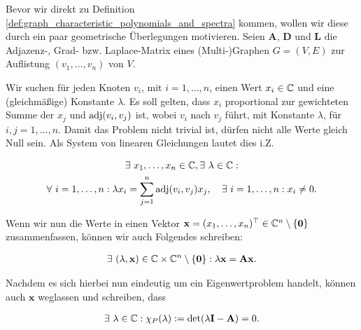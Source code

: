         \begin{remark} \label{rem:motivation}

            Bevor wir direkt zu Definition \ref{def:graph_characteristic_polynomials_and_spectra} kommen, wollen wir diese durch ein paar geometrische Überlegungen motivieren.
            Seien $\mathbf A$, $\mathbf D$ und $\mathbf L$ die Adjazenz-, Grad- bzw. Laplace-Matrix eines (Multi-)Graphen $G = (V, E)$ zur Auflistung $(v_1, \dots, v_n)$ von $V$.

            Wir suchen für jeden Knoten $v_i$, mit $i = 1, \dots, n$, einen Wert $x_i \in \mathbb C$ und eine (gleichmäßige) Konstante $\lambda$.
            Es soll gelten, dass $x_i$ proportional zur gewichteten Summe der $x_j$ und $\operatorname{adj}(v_i, v_j)$ ist, wobei $v_i$ nach $v_j$ führt, mit Konstante $\lambda$, für $i, j = 1, \dots, n$.
            Damit das Problem nicht trivial ist, dürfen nicht alle Werte gleich Null sein.
            Als System von linearen Gleichungen lautet dies i.Z.

            \begin{multline*}
                \exists ~ x_1, \dots, x_n \in \mathbb C,
                \exists ~ \lambda \in \mathbb C: \\
                    \forall ~ i = 1, \dots, n:
                        \lambda x_i
                        =
                        \sum_{j=1}^n \operatorname{adj}(v_i, v_j) x_j,
                    \quad
                    \exists ~ i = 1, \dots, n:
                        x_i \neq 0.
            \end{multline*}

            Wenn wir nun die Werte in einen Vektor $\mathbf x = (x_1, \dots, x_n)^\top \in \mathbb C^n \setminus {\left \{ \mathbf 0 \right \}}$ zusammenfassen, können wir auch Folgendes schreiben:

            \begin{align*}
                \exists ~ (\lambda, \mathbf x) \in \mathbb C \times \mathbb C^n \setminus {\left \{ \mathbf 0 \right \}}:
                    \lambda \mathbf x
                    =
                    \mathbf A \mathbf x.
            \end{align*}

            Nachdem es sich hierbei nun eindeutig um ein Eigenwertproblem handelt, können auch $\mathbf x$ weglassen und schreiben, dass

            \begin{align*}
                \exists ~ \lambda \in \mathbb C:
                    \chi_P(\lambda) := \det(\lambda \mathbf I - \mathbf A) = 0.
            \end{align*}


\end{remark}
